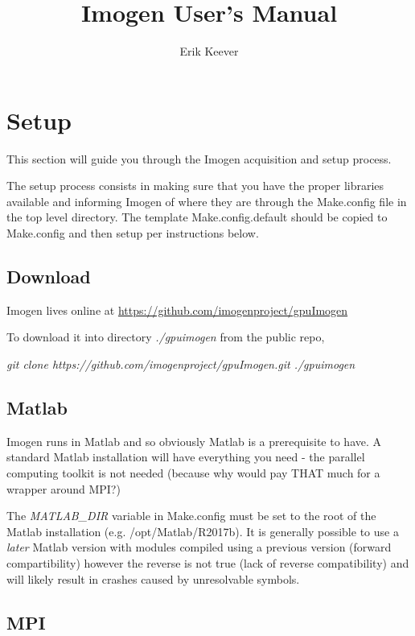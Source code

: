 \documentclass[letterpaper,12pt]{article}
\author{Erik Keever}
\title{Imogen User's Manual}
\begin{document}
 

\maketitle

\section{Setup}

This section will guide you through the Imogen acquisition and setup process.

The setup process consists in making sure that you have the proper libraries
available and informing Imogen of where they are through the Make.config file
in the top level directory. The template Make.config.default should be copied
to Make.config and then setup per instructions below.

\subsection{Download}

Imogen lives online at \url{https://github.com/imogenproject/gpuImogen}

To download it into directory \textit{./gpuimogen} from the public repo,

\textit{ git clone https://github.com/imogenproject/gpuImogen.git ./gpuimogen }

\subsection{Matlab}

Imogen runs in Matlab and so obviously Matlab is a prerequisite to have. A standard
Matlab installation will have everything you need - the parallel computing toolkit
is not needed (because why would pay THAT much for a wrapper around MPI?)

The \textit{MATLAB\_DIR} variable in Make.config must be set to the root of
the Matlab installation (e.g. /opt/Matlab/R2017b). It is generally possible to use
a \textit{later} Matlab version with modules compiled using a previous version
(forward compartibility) however the reverse is not true (lack of reverse compatibility)
and will likely result in crashes caused by unresolvable symbols.

\subsection{MPI}
\end{document}

